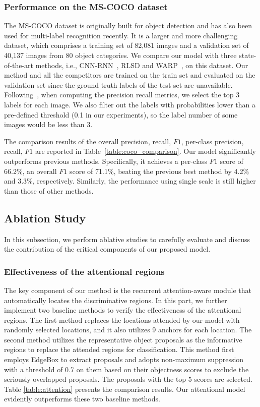 \documentclass[letterpaper]{article} %
\begin{document}
\subsubsection{Performance on the MS-COCO dataset}
The MS-COCO dataset is originally built for object detection and has also been used for multi-label recognition recently. It is a larger and more challenging dataset, which comprises a training set of 82,081 images and a validation set of 40,137 images from 80 object categories. We compare our model with three state-of-the-art methods, i.e., CNN-RNN~\cite{wang2016cnn}, RLSD \cite{zhang2016multi} and WARP~\cite{gong2013deep}, on this dataset. Our method and all the competitors are trained on the train set and evaluated on the validation set since the ground truth labels of the test set are unavailable. Following~\cite{wang2016cnn}, when computing the precision recall metrics, we select the top 3 labels for each image. We also filter out the labels with probabilities lower than a pre-defined threshold (0.1 in our experiments), so the label number of some images would be less than 3.

The comparison results of the overall precision, recall, $F1$, per-class precision, recall, $F1$ are reported in Table~\ref{table:coco_comparison}. Our model significantly outperforms previous methods. Specifically, it achieves a per-class $F1$ score of 66.2\%, an overall $F1$ score of 71.1\%, beating the previous best method by 4.2\% and 3.3\%, respectively.  Similarly, the performance using single scale is still higher than those of other methods.


\subsection{Ablation Study}
In this subsection, we perform ablative studies to carefully evaluate and discuss the contribution of the critical components of our proposed model.

\subsubsection{Effectiveness of the attentional regions}
The key component of our method is the recurrent attention-aware module that automatically locates the discriminative regions. In this part, we further implement two baseline methods to verify the effectiveness of the attentional regions. The first method replaces the locations attended by our model with randomly selected locations, and it also utilizes 9 anchors for each location. The second method utilizes the representative object proposals as the informative regions to replace the attended regions for classification. This method first employs EdgeBox \cite{zitnick2014edge} to extract proposals and adopts non-maximum suppression with a threshold of 0.7 on them based on their objectness scores to exclude the seriously overlapped proposals. The proposals with the top 5 scores are selected. Table \ref{table:attention} presents the comparison results. Our attentional model evidently outperforms these two baseline methods.
\end{document}
